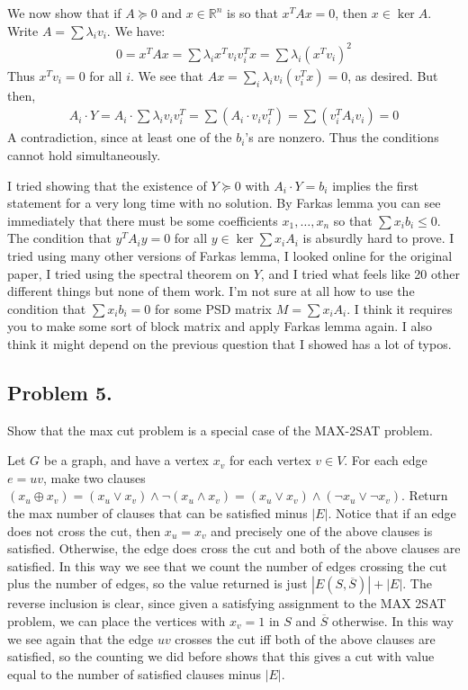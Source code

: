 \documentclass[12pt]{article}
\theoremstyle{definitionstyle}
\def\mbb#1{\mathbb{#1}}
\def\R{\mbb{R}}
\begin{document}
    We now show that if $A \succeq 0$ and $x \in \R^n$ is so that $x^TAx = 0$, then $x \in \ker A$. Write $A = \sum \lambda_i v_i$. We have:
    \begin{align*}
        0 = x^TAx = \sum \lambda_i x^Tv_iv_i^Tx = \sum \lambda_i (x^Tv_i)^2
    \end{align*}
    Thus $x^Tv_i = 0$ for all $i$. We see that $Ax = \sum_i \lambda_i v_i(v_i^Tx) = 0$, as desired. But then,
    \begin{align*}
        A_i \cdot Y = A_i \cdot \sum \lambda_i v_iv_i^T = \sum(A_i \cdot v_iv_i^T) = \sum(v_i^TA_i v_i) = 0
    \end{align*}
    A contradiction, since at least one of the $b_i$'s are nonzero. Thus the conditions cannot hold simultaneously. 

    I tried showing that the existence of $Y \succeq 0$ with $A_i \cdot Y = b_i$ implies the first statement for a very long time with no solution. By Farkas lemma you can see immediately that there must be some coefficients $x_1, \ldots, x_n$ so that $\sum x_ib_i \leq 0$. The condition that $y^TA_iy = 0$ for all $y \in \ker \sum x_iA_i$ is absurdly hard to prove. I tried using many other versions of Farkas lemma, I looked online for the original paper, I tried using the spectral theorem on $Y$, and I tried what feels like 20 other different things but none of them work. I'm not sure at all how to use the condition that $\sum x_ib_i = 0$ for some PSD matrix $M = \sum x_iA_i$. I think it requires you to make some sort of block matrix and apply Farkas lemma again. I also think it might depend on the previous question that I showed has a lot of typos.

    \subsection*{Problem 5.}
    Show that the max cut problem is a special case of the MAX-2SAT problem.

    Let $G$ be a graph, and have a vertex $x_v$ for each vertex $v \in V$. For each edge $e = uv$, make two clauses $(x_u \oplus x_v) = (x_u \lor x_v) \land \lnot (x_u \land x_v) = (x_u \lor x_v) \land (\lnot x_u \lor \lnot x_v)$. Return the max number of clauses that can be satisfied minus $|E|$. Notice that if an edge does not cross the cut, then $x_u=x_v$ and precisely one of the above clauses is satisfied. Otherwise, the edge does cross the cut and both of the above clauses are satisfied. In this way we see that we count the number of edges crossing the cut plus the number of edges, so the value returned is just $|E(S, \overline S)| + |E|$. The reverse inclusion is clear, since given a satisfying assignment to the MAX 2SAT problem, we can place the vertices with $x_v=1$ in $S$ and $\overline S$ otherwise. In this way we see again that the edge $uv$ crosses the cut iff both of the above clauses are satisfied, so the counting we did before shows that this gives a cut with value equal to the number of satisfied clauses minus $|E|$.
\end{document}
